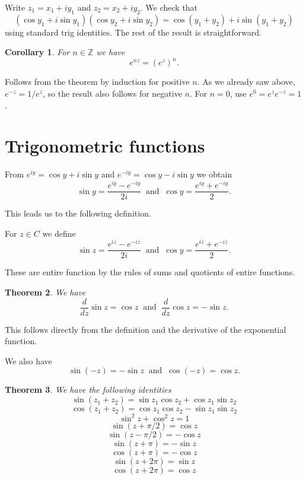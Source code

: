\documentclass[a4paper,10pt]{article}
\newcommand{\Z}{\mathbb{Z}}
\newtheorem{theorem}{Theorem}[section]
\newtheorem{corollary}[theorem]{Corollary}
\newenvironment{definition}[1][Definition]{\begin{trivlist}
\item[\hskip \labelsep {\bfseries #1}]}{\end{trivlist}}
\begin{document}
Write $z_1 = x_1 + iy_1$ and $z_2 = x_2 + iy_2$. We check that
$$(\cos y_1 + i\sin y_1)(\cos y_2 + i\sin y_2) = \cos (y_1 + y_2) + i\sin (y_1 + y_2)$$
using standard trig identities. The rest of the result is straightforward.

\begin{corollary}
For $n \in \Z$ we have
$$e^{nz} = (e^z)^n.$$
\end{corollary}

Follows from the theorem by induction for positive $n$. As we already saw above, $e^{-z} = 1/e^z$, so the result also follows for negative $n$. For $n = 0$, use $e^0 = e^ze^{-z} = 1$.

\section{Trigonometric functions}

From $e^{iy} = \cos y + i\sin y$ and $e^{-iy} = \cos y - i\sin y$ we obtain
$$\sin y = \frac{e^{iy} - e^{-iy}}{2i} \;\;\mbox{and}\;\; \cos y = \frac{e^{iy} + e^{-iy}}{2}.$$

This leads us to the following definition.

\begin{definition}
For $z \in C$ we define
$$\sin z = \frac{e^{iz} - e^{-iz}}{2i} \;\;\mbox{and}\;\; \cos y = \frac{e^{iz} + e^{-iz}}{2}.$$
\end{definition}

These are entire function by the rules of sums and quotients of entire functions.

\begin{theorem}
We have
$$\frac{d}{dz}\sin z = \cos z \;\;\mbox{and}\;\; \frac{d}{dz}\cos z = -\sin z.$$
\end{theorem}

This follows directly from the definition and the derivative of the exponential function.

We also have
$$\sin(-z) = -\sin z \;\;\mbox{and}\;\; \cos(-z) = \cos z.$$

\begin{theorem}
We have the following identities
$$\sin(z_1 + z_2) = \sin z_1\cos z_2 + \cos z_1\sin z_2$$
$$\cos(z_1 + z_2) = \cos z_1\cos z_2 - \sin z_1\sin z_2$$
$$\sin^2 z + \cos^2 z = 1$$
$$\sin(z + \pi/2) = \cos z$$
$$\sin(z - \pi/2) = -\cos z$$
$$\sin(z + \pi) = -\sin z$$
$$\cos(z + \pi) = -\cos z$$
$$\sin(z + 2\pi) = \sin z$$
$$\cos(z + 2\pi) = \cos z$$
\end{theorem}
\end{document}
